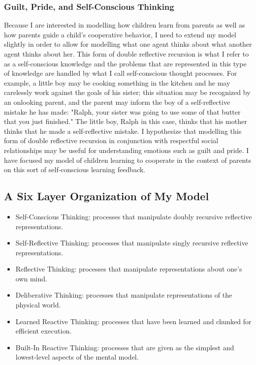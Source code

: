 \subsubsection{Guilt, Pride, and Self-Conscious Thinking}

Because I are interested in modelling how children learn from parents
as well as how parents guide a child's cooperative behavior, I need
to extend my model slightly in order to allow for modelling what one
agent thinks about what another agent thinks about her. This form of
double reflective recursion is what I refer to as a self-conscious
knowledge and the problems that are represented in this type of
knowledge are handled by what I call self-conscious thought
processes. For example, a little boy may be cooking something in the
kitchen and he may carelessly work against the goals of his sister;
this situation may be recognized by an onlooking parent, and the
parent may inform the boy of a self-reflective mistake he has made:
"Ralph, your sister was going to use some of that butter that you just
finished." The little boy, Ralph in this case, thinks that his mother
thinks that he made a self-reflective mistake. I hypothesize that
modelling this form of double reflective recursion in conjunction with
respectful social relationships may be useful for understanding
emotions such as guilt and pride. I have focused my model of
children learning to cooperate in the context of parents on this sort
of self-conscious learning feedback.

\subsection{A Six Layer Organization of My Model}

\begin{itemize}
\item{Self-Conscious Thinking: processes that manipulate doubly recursive reflective representations.}
\item{Self-Reflective Thinking: processes that manipulate singly recursive reflective representations.}
\item{Reflective Thinking: processes that manipulate representations about one's own mind.}
\item{Deliberative Thinking: processes that manipulate representations of the physical world.}
\item{Learned Reactive Thinking: processes that have been learned and chunked for efficient execution.}
\item{Built-In Reactive Thinking: processes that are given as the simplest and lowest-level aspects of the mental model.}
\end{itemize}

